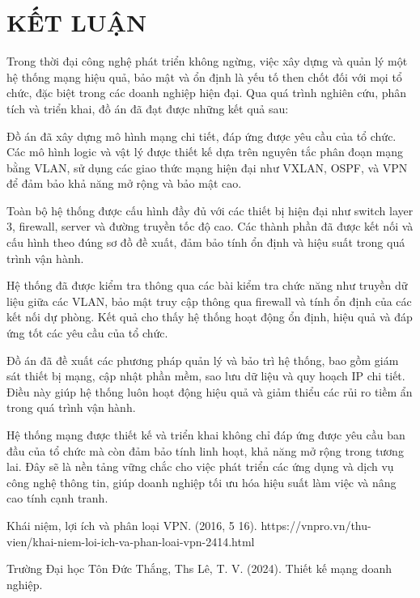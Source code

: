 \documentclass[13pt]{report}
\begin{document}
    \newpage
    

    \newpage
    
\newpage
 \section*{\centering \fontsize{18pt}{20pt}\selectfont KẾT LUẬN}

Trong thời đại công nghệ phát triển không ngừng, việc xây dựng và quản lý một hệ thống mạng hiệu quả, bảo mật và ổn định là yếu tố then chốt đối với mọi tổ chức, đặc biệt trong các doanh nghiệp hiện đại. Qua quá trình nghiên cứu, phân tích và triển khai, đồ án đã đạt được những kết quả sau:

Đồ án đã xây dựng mô hình mạng chi tiết, đáp ứng được yêu cầu của tổ chức. Các mô hình logic và vật lý được thiết kế dựa trên nguyên tắc phân đoạn mạng bằng VLAN, sử dụng các giao thức mạng hiện đại như VXLAN, OSPF, và VPN để đảm bảo khả năng mở rộng và bảo mật cao.

Toàn bộ hệ thống được cấu hình đầy đủ với các thiết bị hiện đại như switch layer 3, firewall, server và đường truyền tốc độ cao. Các thành phần đã được kết nối và cấu hình theo đúng sơ đồ đề xuất, đảm bảo tính ổn định và hiệu suất trong quá trình vận hành.

Hệ thống đã được kiểm tra thông qua các bài kiểm tra chức năng như truyền dữ liệu giữa các VLAN, bảo mật truy cập thông qua firewall và tính ổn định của các kết nối dự phòng. Kết quả cho thấy hệ thống hoạt động ổn định, hiệu quả và đáp ứng tốt các yêu cầu của tổ chức.

Đồ án đã đề xuất các phương pháp quản lý và bảo trì hệ thống, bao gồm giám sát thiết bị mạng, cập nhật phần mềm, sao lưu dữ liệu và quy hoạch IP chi tiết. Điều này giúp hệ thống luôn hoạt động hiệu quả và giảm thiểu các rủi ro tiềm ẩn trong quá trình vận hành.

Hệ thống mạng được thiết kế và triển khai không chỉ đáp ứng được yêu cầu ban đầu của tổ chức mà còn đảm bảo tính linh hoạt, khả năng mở rộng trong tương lai. Đây sẽ là nền tảng vững chắc cho việc phát triển các ứng dụng và dịch vụ công nghệ thông tin, giúp doanh nghiệp tối ưu hóa hiệu suất làm việc và nâng cao tính cạnh tranh.
    
\newpage
     
\begin{thebibliography}{00}

 Khái niệm, lợi ích và phân loại VPN. (2016, 5 16). https://vnpro.vn/thu-vien/khai-niem-loi-ich-va-phan-loai-vpn-2414.html

 Trường Đại học Tôn Đức Thắng, Ths Lê, T. V. (2024). Thiết kế mạng doanh nghiệp.





\end{thebibliography}
\end{document}
